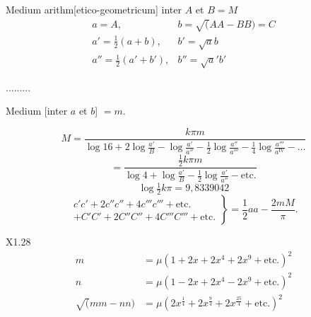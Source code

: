 \begingroup
\makeatletter\tagsleft@true\let\veqno\@@leqno\makeatother
\clearpage{}\NoSourceHead
{}
\par\indent Medium arithm[etico-geometricum] inter \(A\) et \(B=M\)
\[\begin{array}{ll}
a=A,&b=\surd(AA-BB)=C\\
a'=\frac12(a+b),&b'=\surd ab\\
a''=\frac12(a'+b'),&b''=\surd a'b'
\end{array}\]
\begin{center}.\quad .\quad .\quad .\quad .\quad .\quad .\quad .\quad .\end{center}
\begin{center}Medium [inter \(a\) et \(b\)] \(=m\).\end{center}
{\small
\begin{equation*}\tag*{[1]}
M=\frac{k\pi m}{\log16+2\log\frac{a'}B-\log\frac{a'}{a''}-\frac12\log\frac{a''}{a'''}-\frac14\log\frac{a'''}{a^{\mathrm{IV}}}-\ldots}
\end{equation*}}
\begin{equation*}\tag*{[2]}
=\frac{\frac12k\pi m}{\log4+\log\frac{a'}B-\frac12\log\frac{a'}{a''}-\text{etc.}}
\end{equation*}
\begin{equation*}\tag*{[3]}\log\tfrac12k\pi=9{,}8339042\end{equation*}
\begin{equation*}\tag*{[4]}
\left.\begin{aligned}
c'c'+2c''c''+4c'''c'''+\text{etc.}\\
+C'C'+2C''C''+4C'''C'''+\text{etc.}
\end{aligned}\right\}=\frac12aa-\frac{2mM}{\pi}.
\end{equation*}
\ClosingRule
\par\bigskip\noindent\small X1.\hfill28\normalsize
\clearpage{}
\[\begin{aligned}
m&=\mu(1+2x+2x^4+2x^9+\text{etc.})^2\\
n&=\mu(1-2x+2x^4-2x^9+\text{etc.})^2\\
\surd(mm-nn)&=\mu(2x^{\frac14}+2x^{\frac94}+2x^{\frac{25}4}+\text{etc.})^2
\end{aligned}\]
